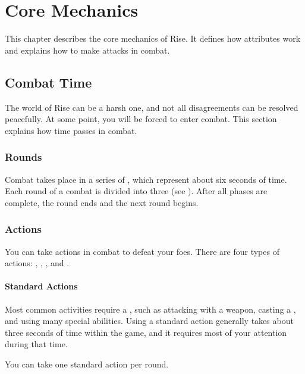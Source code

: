 \chapter{Core Mechanics}

This chapter describes the core mechanics of Rise.
It defines how attributes work and explains how to make attacks in combat.

\section{Combat Time}\label{Combat Time}
    The world of Rise can be a harsh one, and not all disagreements can be resolved peacefully.
    At some point, you will be forced to enter combat.
    This section explains how time passes in combat.

    \subsection{Rounds}\label{Rounds}

        Combat takes place in a series of , which represent about six seconds of time.
        Each round of a combat is divided into three  (see ).
        After all phases are complete, the round ends and the next round begins.

    \subsection{Actions}\label{Actions}

        You can take actions in combat to defeat your foes.
        There are four types of actions: , , , and .

        \subsubsection{Standard Actions}\label{Standard Actions}
            Most common activities require a , such as attacking with a weapon, casting a , and using many special abilities.
            Using a standard action generally takes about three seconds of time within the game, and it requires most of your attention during that time.

            You can take one standard action per round.


